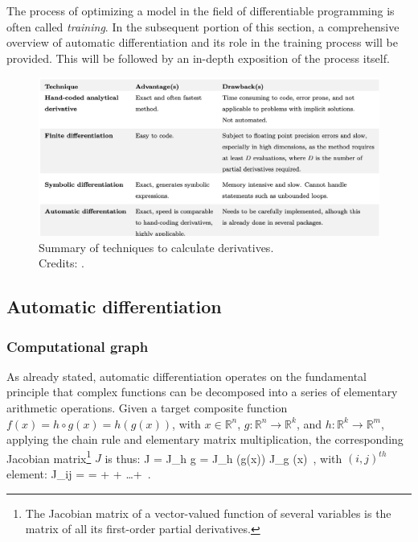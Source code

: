 The process of optimizing a model in the field of differentiable programming is often called \emph{training}.
In the subsequent portion of this section, a comprehensive overview of automatic differentiation and its role in the training process will be provided. This will be followed by an in-depth exposition of the process itself.

\begin{figure}
    \centering
    \includegraphics[width=\linewidth, keepaspectratio]{img//chapter4/diff_methods.png}
    \caption[Summary of techniques to calculate derivatives]{Summary of techniques to calculate derivatives.\\\small{Credits: \cite{margossian_review_2019}.}}
    \label{fig:diff_methods}
\end{figure}


\subsection{Automatic differentiation}
\label{subsec:automatic_differentiation}


\subsubsection{Computational graph}
\label{subsubsec:computational_graph}
As already stated, automatic differentiation operates on the fundamental principle that complex functions can be decomposed into a series of elementary arithmetic operations. Given a target composite function $f (x) = h \circ g(x) = h(g(x))$, with $x \in \mathbb{R}^n$, $g : \mathbb{R}^n \rightarrow \mathbb{R}^k$, and $h : \mathbb{R}^k \rightarrow \mathbb{R}^m$, applying the chain rule and elementary matrix multiplication, the corresponding Jacobian matrix\footnote{The Jacobian matrix of a vector-valued function of several variables is the matrix of all its first-order partial derivatives.} $J$ is thus:
\be
\label{eq:4.1}
J = J_{h \circ g} = J_h (g(x)) \cdot J_g (x) \,,
\ee
with $(i,j)^{th}$ element:
\be
\label{eq:4.2}
J_{ij} =  =   +   + \ldots +   \,.
\ee

